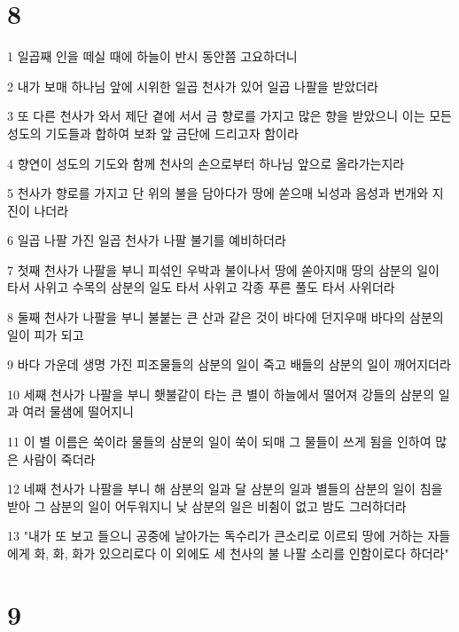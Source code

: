 \chapter{8}

\par 1 일곱째 인을 떼실 때에 하늘이 반시 동안쯤 고요하더니
\par 2 내가 보매 하나님 앞에 시위한 일곱 천사가 있어 일곱 나팔을 받았더라
\par 3 또 다른 천사가 와서 제단 곁에 서서 금 향로를 가지고 많은 향을 받았으니 이는 모든 성도의 기도들과 합하여 보좌 앞 금단에 드리고자 함이라
\par 4 향연이 성도의 기도와 함께 천사의 손으로부터 하나님 앞으로 올라가는지라
\par 5 천사가 향로를 가지고 단 위의 불을 담아다가 땅에 쏟으매 뇌성과 음성과 번개와 지진이 나더라
\par 6 일곱 나팔 가진 일곱 천사가 나팔 불기를 예비하더라
\par 7 첫째 천사가 나팔을 부니 피섞인 우박과 불이나서 땅에 쏟아지매 땅의 삼분의 일이 타서 사위고 수목의 삼분의 일도 타서 사위고 각종 푸른 풀도 타서 사위더라
\par 8 둘째 천사가 나팔을 부니 불붙는 큰 산과 같은 것이 바다에 던지우매 바다의 삼분의 일이 피가 되고
\par 9 바다 가운데 생명 가진 피조물들의 삼분의 일이 죽고 배들의 삼분의 일이 깨어지더라
\par 10 세째 천사가 나팔을 부니 횃불같이 타는 큰 별이 하늘에서 떨어져 강들의 삼분의 일과 여러 물샘에 떨어지니
\par 11 이 별 이름은 쑥이라 물들의 삼분의 일이 쑥이 되매 그 물들이 쓰게 됨을 인하여 많은 사람이 죽더라
\par 12 네째 천사가 나팔을 부니 해 삼분의 일과 달 삼분의 일과 별들의 삼분의 일이 침을 받아 그 삼분의 일이 어두워지니 낮 삼분의 일은 비췸이 없고 밤도 그러하더라
\par 13 "내가 또 보고 들으니 공중에 날아가는 독수리가 큰소리로 이르되 땅에 거하는 자들에게 화, 화, 화가 있으리로다 이 외에도 세 천사의 불 나팔 소리를 인함이로다 하더라"

\chapter{9}


